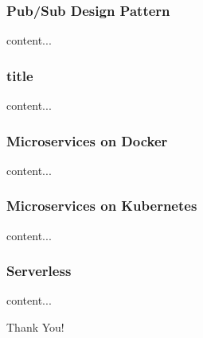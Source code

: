 \documentclass{beamer}
\begin{document}
\begin{frame}\frametitle{Pub/Sub Design Pattern}
content...
\end{frame}


\begin{frame}\frametitle{title}
content...
\end{frame}

\begin{frame}\frametitle{Microservices on Docker}
	content...
\end{frame}

\begin{frame}\frametitle{Microservices on Kubernetes}
content...
\end{frame}

\begin{frame}\frametitle{Serverless}
content...
\end{frame}




\begin{frame}
\Huge{\centerline{Thank You!}}
\end{frame}

\end{document}
